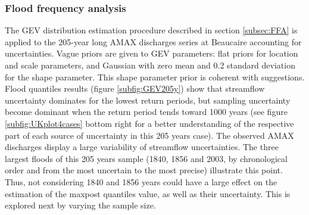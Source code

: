 \documentclass[11pt]{article}
\begin{document}
        \subsubsection{Flood frequency analysis}
        
       The GEV distribution estimation procedure described in section \ref{subsec:FFA} is applied to the 205-year long AMAX discharges series at Beaucaire accounting for uncertainties. Vague priors are given to GEV parameters: flat priors for location and scale parameters, and Gaussian with zero mean and 0.2 standard deviation for the shape parameter. This shape parameter prior is coherent with \citet{martins_generalized_2000} suggestions.
       Flood quantiles results (figure \ref{subfig:GEV205y}) show that streamflow uncertainty dominates for the lowest return periods, but sampling uncertainty become dominant when the return period tends toward 1000 years (see figure \ref{subfig:UKplot4cases} bottom right  for a better understanding of the respective part of each source of uncertainty in this 205 years case). The observed AMAX discharges display a large variability of streamflow uncertainties. The three largest floods of this 205 years sample (1840, 1856 and 2003, by chronological order and from the most uncertain to the most precise) illustrate this point. Thus, not considering 1840 and 1856 years could have a large effect on the estimation of the maxpost quantiles value, as well as their uncertainty. This is explored next by varying the sample size.
       
        
\end{document}

